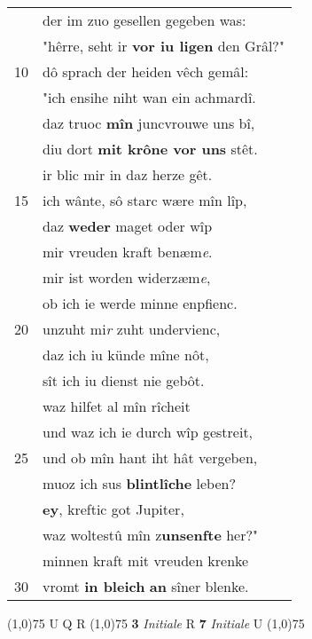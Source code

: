 \documentclass[8pt,a4paper,notitlepage]{article}
\begin{document}
\begin{table}[ht]
\begin{minipage}[t]{0.5\linewidth}
\begin{tabular}{rl}
 & der im zuo gesellen gegeben was:\\ 
 & "hêrre, seht ir \textbf{vor iu ligen} den Grâl?"\\ 
10 & dô sprach der heiden vêch gemâl:\\ 
 & "ich ensihe niht wan ein achmardî.\\ 
 & daz truoc \textbf{mîn} juncvrouwe uns bî,\\ 
 & diu dort \textbf{mit krône vor uns} stêt.\\ 
 & ir blic mir in daz herze gêt.\\ 
15 & ich wânte, sô starc wære mîn lîp,\\ 
 & daz \textbf{weder} maget oder wîp\\ 
 & mir vreuden kraft benæm\textit{e}.\\ 
 & mir ist worden widerzæm\textit{e},\\ 
 & ob ich ie werde minne enpfienc.\\ 
20 & unzuht mi\textit{r} zuht undervienc,\\ 
 & daz ich iu künde mîne nôt,\\ 
 & sît ich iu dienst nie gebôt.\\ 
 & waz hilfet al mîn rîcheit\\ 
 & und waz ich ie durch wîp gestreit,\\ 
25 & und ob mîn hant iht hât vergeben,\\ 
 & muoz ich sus \textbf{blintlîche} leben?\\ 
 & \textbf{ey}, kreftic got Jupiter,\\ 
 & waz woltestû mîn z\textbf{unsenfte} her?"\\ 
 & minnen kraft mit vreuden krenke\\ 
30 & vromt \textbf{in bleich} \textbf{an} sîner blenke.\\ 
\end{tabular}
\scriptsize
\line(1,0){75} \newline
U Q R \newline
\line(1,0){75} \newline
\textbf{3} \textit{Initiale} R  \textbf{7} \textit{Initiale} U  \newline
\line(1,0){75} \newline

\end{minipage}
\end{table}
\end{document}
